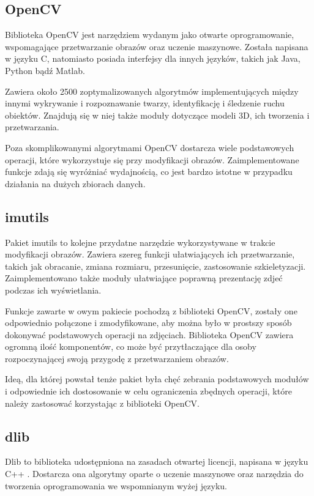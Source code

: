 \subsection{OpenCV}
Biblioteka OpenCV \cite{opencv} jest narzędziem wydanym jako otwarte oprogramowanie, wspomagające przetwarzanie obrazów oraz uczenie maszynowe. Została napisana w języku C, natomiasto posiada interfejsy dla innych języków, takich jak Java, Python bądź Matlab.

Zawiera około 2500 zoptymalizowanych algorytmów implementujących między innymi wykrywanie i rozpoznawanie twarzy, identyfikację i śledzenie ruchu obiektów. Znajdują się w niej także moduły dotyczące modeli 3D, ich tworzenia i przetwarzania.

Poza skomplikowanymi algorytmami OpenCV dostarcza wiele podstawowych operacji, które wykorzystuje się przy modyfikacji obrazów. Zaimplementowane funkcje zdają się wyróżniać wydajnością, co jest bardzo istotne w przypadku działania na dużych zbiorach danych.

\subsection{imutils}
Pakiet imutils \cite{imutils} to kolejne przydatne narzędzie wykorzystywane w trakcie modyfikacji obrazów. Zawiera szereg funkcji ułatwiających ich przetwarzanie, takich jak obracanie, zmiana rozmiaru, przesunięcie, zastosowanie szkieletyzacji. Zaimplementowano także moduły ułatwiające poprawną prezentację zdjeć podczas ich wyświetlania.

Funkcje zawarte w owym pakiecie pochodzą z biblioteki OpenCV, zostały one odpowiednio połączone i zmodyfikowane, aby można było w prostszy sposób dokonywać podstawowych operacji na zdjęciach. Biblioteka OpenCV zawiera ogromną ilość komponentów, co może być przytłaczające dla osoby rozpoczynającej swoją przygodę z przetwarzaniem obrazów.

Ideą, dla której powstał tenże pakiet była chęć zebrania podstawowych modułów i odpowiednie ich dostosowanie w celu ograniczenia zbędnych operacji, które należy zastosować korzystając z biblioteki OpenCV.

\subsection{dlib}
Dlib to biblioteka udostępniona na zasadach otwartej licencji, napisana w języku C++ \cite{dlib}. Dostarcza ona algorytmy oparte o uczenie maszynowe oraz narzędzia do tworzenia oprogramowania we wspomnianym wyżej języku. 

